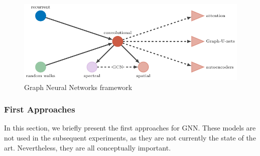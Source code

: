 \documentclass[smallextended]{svjour3}
\begin{document}
\begin{appendices}
		\begin{figure}[!t]
			\centering
			\includegraphics[width=.75\linewidth]{FigC1} 	
			
			
			\caption{Graph Neural Networks framework}
			\label{fig:timeline}
		\end{figure}
		
		\subsubsection{First Approaches}
		In this section, we briefly present the first approaches for GNN. These models are not used in the subsequent experiments, as they are not currently the state of the art. Nevertheless, they are all conceptually important.
		

\end{appendices}
\end{document}
